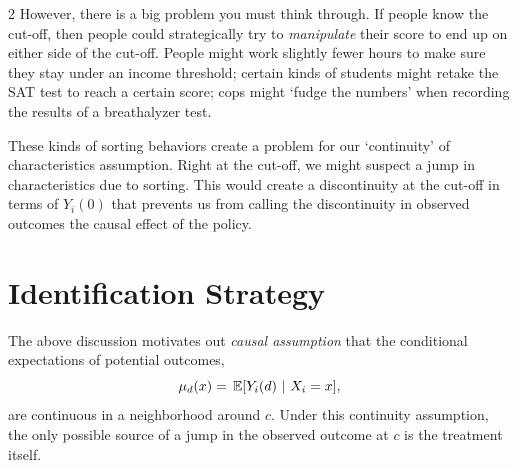 \documentclass[12pt]{article}
\begin{document}
\begin{multicols}{2}
However, there is a big problem you must think through. 
If people know the cut-off, then people could strategically try to \emph{manipulate} their score to end up on either side of the cut-off.
People might work slightly fewer hours to make sure they stay under an income threshold; certain kinds of students might retake the SAT test to reach a certain score; cops might `fudge the numbers' when recording the results of a breathalyzer test. 

These kinds of sorting behaviors create a problem for our `continuity' of characteristics assumption. 
Right at the cut-off, we might suspect a jump in characteristics due to sorting.
This would create a discontinuity at the cut-off in terms of $Y_i(0)$ that prevents us from calling the discontinuity in observed outcomes the causal effect of the policy.







% 

\section*{Identification Strategy}
The above discussion motivates out \emph{causal assumption} that the conditional expectations of potential outcomes,
$$\mu_d(x) = \expec{Y_i(d)}{X_i = x},$$
are continuous in a neighborhood around $c$.
Under this continuity assumption, the only possible source of a jump in the observed outcome at $c$ is the treatment itself.


\end{multicols}
\end{document}
